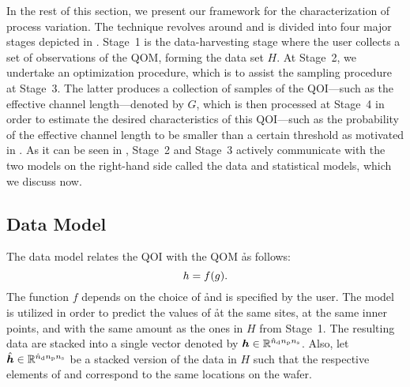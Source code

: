 In the rest of this section, we present our framework for the characterization
of process variation. The technique revolves around  and is
divided into four major stages depicted in . Stage~1 is
the data-harvesting stage where the user collects a set of observations of the
\ac{QOM}, forming the data set $H$. At Stage~2, we undertake an optimization
procedure, which is to assist the sampling procedure at Stage~3. The latter
produces a collection of samples of the \ac{QOI}---such as the effective channel
length---denoted by $G$, which is then processed at Stage~4 in order to estimate
the desired characteristics of this \ac{QOI}---such as the probability of the
effective channel length to be smaller than a certain threshold as motivated in
. As it can be seen in ,
Stage~2 and Stage~3 actively communicate with the two models on the right-hand
side called the data and statistical models, which we discuss now.

\subsection{Data Model}

The data model relates the \ac{QOI} \g with the \ac{QOM} \h as follows:
\[
  h = f(g).
\]
The function $f$ depends on the choice of \h and is specified by the user. The
model is utilized in order to predict the values of \h at the same sites, at the
same inner points, and with the same amount as the ones in $H$ from Stage~1. The
resulting data are stacked into a single vector denoted by $\boldsymbol{h} \in \mathbb{R}^{{\hat{n}_\mathrm{d}}
{n_\mathrm{p}} {n_\mathrm{s}}}$. Also, let $\hat{\boldsymbol{h}} \in \mathbb{R}^{{\hat{n}_\mathrm{d}} {n_\mathrm{p}} {n_\mathrm{s}}}$ be a stacked version of the
data in $H$ such that the respective elements of \vh and \hvh correspond to the
same locations on the wafer.

